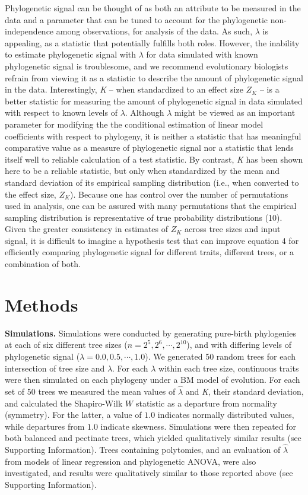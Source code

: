 \documentclass[9pt,twocolumn,twoside,lineno]{pnas-new}
\begin{document}
Phylogenetic signal can be thought of as both an attribute to be
measured in the data and a parameter that can be tuned to account for
the phylogenetic non-independence among observations, for analysis of
the data. As such, \(\lambda\) is appealing, as a statistic that
potentially fulfills both roles. However, the inability to estimate
phylogenetic signal with \(\lambda\) for data simulated with known
phylogenetic signal is troublesome, and we recommend evolutionary
biologists refrain from viewing it as a statistic to describe the amount
of phylogenetic signal in the data. Interestingly, \emph{K} -- when
standardized to an effect size \(Z_K\) -- is a better statistic for
measuring the amount of phylogenetic signal in data simulated with
respect to known levels of \(\lambda\). Although \(\lambda\) might be
viewed as an important parameter for modifying the the conditional
estimation of linear model coefficients with respect to phylogeny, it is
neither a statistic that has meaningful comparative value as a measure
of phylogenetic signal nor a statistic that lends itself well to
reliable calculation of a test statistic. By contrast, \emph{K} has been
shown here to be a reliable statistic, but only when standardized by the
mean and standard deviation of its empirical sampling distribution
(i.e., when converted to the effect size, \(Z_K\)). Because one has
control over the number of permutations used in analysis, one can be
assured with many permutations that the empirical sampling distribution
is representative of true probability distributions (10). Given the
greater consistency in estimates of \(Z_K\) across tree sizes and input
signal, it is difficult to imagine a hypothesis test that can improve
equation 4 for efficiently comparing phylogenetic signal for different
traits, different trees, or a combination of both.

\hypertarget{methods}{%
\section{Methods}\label{methods}}

\textbf{Simulations.} Simulations were conducted by generating
pure-birth phylogenies at each of six different tree sizes
(\(n=2^5, 2^6, \cdots, 2^{10}\)), and with differing levels of
phylogenetic signal (\(\lambda=0.0, 0.5, \cdots, 1.0\)). We generated 50
random trees for each intersection of tree size and \(\lambda\). For
each \(\lambda\) within each tree size, continuous traits were then
simulated on each phylogeny under a BM model of evolution. For each set
of 50 trees we measured the mean values of \(\hat{\lambda}\) and
\emph{K}, their standard deviation, and calculated the Shapiro-Wilk
\(W\) statistic as a departure from normality (symmetry). For the
latter, a value of \(1.0\) indicates normally distributed values, while
departures from \(1.0\) indicate skewness. Simulations were then
repeated for both balanced and pectinate trees, which yielded
qualitatively similar results (see Supporting Information). Trees
containing polytomies, and an evaluation of \(\hat{\lambda}\) from
models of linear regression and phylogenetic ANOVA, were also
investigated, and results were qualitatively similar to those reported
above (see Supporting Information).
\end{document}
